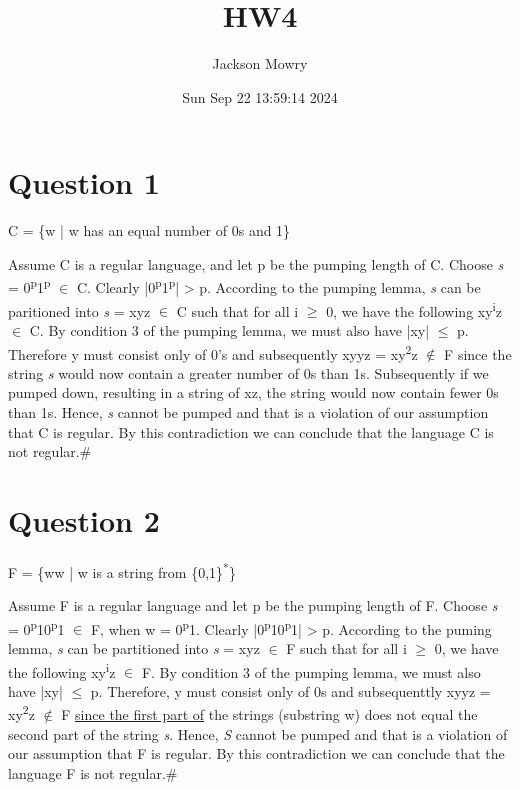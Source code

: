 \documentclass[letterpaper, 12pt]{article}
\author{Jackson Mowry}
\date{Sun Sep 22 13:59:14 2024}
\title{HW4}
\begin{document}
\maketitle
\tableofcontents

\section{Question 1}
\label{sec:orgc7263ff}
C = \{w | w has an equal number of 0s and 1\}

Assume C is a regular language, and let p be the pumping length of C. Choose \emph{s} = 0\textsuperscript{p}1\textsuperscript{p} \(\in\) C. Clearly |0\textsuperscript{p}1\textsuperscript{p}| \textgreater{} p. According to the pumping lemma, \emph{s} can be paritioned into \emph{s} = xyz \(\in\) C such that for all i \(\ge\) 0, we have the following xy\textsuperscript{i}z \(\in\) C. By condition 3 of the pumping lemma, we must also have |xy| \(\le\) p. Therefore y must consist only of 0's and subsequently xyyz = xy\textsuperscript{2}z \(\notin\) F since the string \emph{s} would now contain a greater number of 0s than 1s. Subsequently if we pumped down, resulting in a string of xz, the string would now contain fewer 0s than 1s. Hence, \emph{s} cannot be pumped and that is a violation of our assumption that C is regular. By this contradiction we can conclude that the language C is not regular.\#
\section{Question 2}
\label{sec:org8ace072}
F = \{ww | w is a string from \{0,1\}\textsuperscript{*}\}

Assume F is a regular language and let p be the pumping length of F. Choose \emph{s} = 0\textsuperscript{p}10\textsuperscript{p}1 \(\in\) F, when w = 0\textsuperscript{p}1. Clearly |0\textsuperscript{p}10\textsuperscript{p}1| \textgreater{} p. According to the puming lemma, \emph{s} can be partitioned into \emph{s} = xyz \(\in\) F such that for all i \(\ge\) 0, we have the following xy\textsuperscript{i}z \(\in\) F. By condition 3 of the pumping lemma, we must also have |xy| \(\le\) p. Therefore, y must consist only of 0s and subsequenttly xyyz = xy\textsuperscript{2}z \(\notin\) F \uline{since the first part of} the strings (substring w) does not equal the second part of the string \emph{s}. Hence, \emph{S} cannot be pumped and that is a violation of our assumption that F is regular. By this contradiction we can conclude that the language F is not regular.\#
\end{document}
